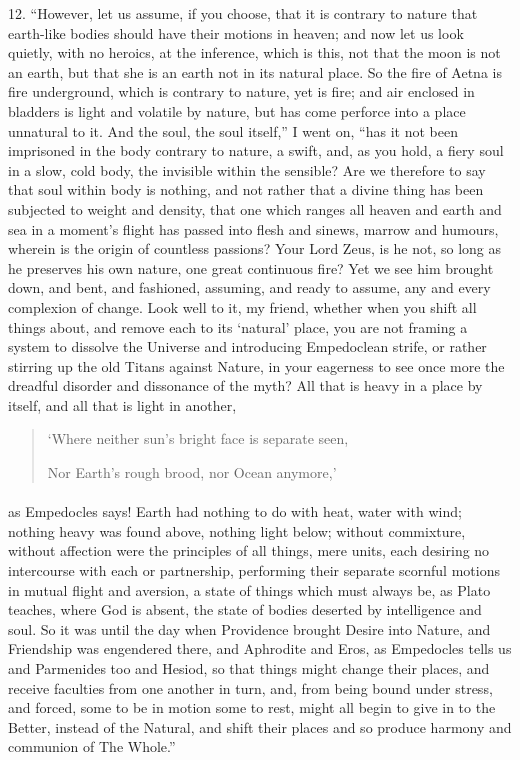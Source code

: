 \documentclass[a4paper, 11pt, oneside, polutonikogreek, english]{article}
\begin{document}
12. ``However, let us assume, if you choose, that it is contrary to nature that earth-like bodies should have their motions in heaven; and now let us look quietly, with no heroics, at the inference, which is this, not that the moon is not an earth, but that she is an earth not in its natural place. So the fire of Aetna is fire underground, which is contrary to nature, yet is fire; and air enclosed in bladders is light and volatile by nature, but has come perforce into a place unnatural to it. And the soul, the soul itself,'' I went on, ``has it not been imprisoned in the body contrary to nature, a swift, and, as you hold, a fiery soul in a slow, cold body, the invisible within the sensible? Are we therefore to say that soul within body is nothing, and not rather that a divine thing has been subjected to weight and density, that one which ranges all heaven and earth and sea in a moment's flight has passed into flesh and sinews, marrow and humours, wherein is the origin of countless passions? Your Lord Zeus, is he not, so long as he preserves his own nature, one great continuous fire? Yet we see him brought down, and bent, and fashioned, assuming, and ready to assume, any and every complexion of change. Look well to it, my friend, whether when you shift all things about, and remove each to its `natural' place, you are not framing a system to dissolve the Universe and introducing Empedoclean strife, or rather stirring up the old Titans against Nature, in your eagerness to see once more the dreadful disorder and dissonance of the myth? All that is heavy in a place by itself, and all that is light in another,
\begin{quotation}
`Where neither sun's bright face is separate seen,

Nor Earth's rough brood, nor Ocean anymore,'
\end{quotation}
\paragraph{}
as Empedocles says! Earth had nothing to do with heat, water with wind; nothing heavy was found above, nothing light below; without commixture, without affection were the principles of all things, mere units, each desiring no intercourse with each or partnership, performing their separate scornful motions in mutual flight and aversion, a state of things which must always be, as Plato teaches, where God is absent, the state of bodies deserted by intelligence and soul. So it was until the day when Providence brought Desire into Nature, and Friendship was engendered there, and Aphrodite and Eros, as Empedocles tells us and Parmenides too and Hesiod, so that things might change their places, and receive faculties from one another in turn, and, from being bound under stress, and forced, some to be in motion some to rest, might all begin to give in to the Better, instead of the Natural, and shift their places and so produce harmony and communion of The Whole.''
\end{document}
